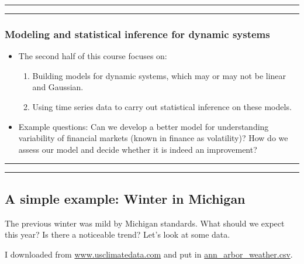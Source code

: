 \documentclass[]{article}
\begin{document}
\begin{center}\rule{0.5\linewidth}{\linethickness}\end{center}

\begin{center}\rule{0.5\linewidth}{\linethickness}\end{center}

\subsubsection{Modeling and statistical inference for dynamic
systems}\label{modeling-and-statistical-inference-for-dynamic-systems}

\begin{itemize}
\item
  The second half of this course focuses on:

  \begin{enumerate}
  \def\labelenumi{\arabic{enumi}.}
  \item
    Building models for dynamic systems, which may or may not be linear
    and Gaussian.
  \item
    Using time series data to carry out statistical inference on these
    models.
  \end{enumerate}
\item
  Example questions: Can we develop a better model for understanding
  variability of financial markets (known in finance as volatility)? How
  do we assess our model and decide whether it is indeed an improvement?
\end{itemize}

\begin{center}\rule{0.5\linewidth}{\linethickness}\end{center}

\begin{center}\rule{0.5\linewidth}{\linethickness}\end{center}

\subsection{A simple example: Winter in
Michigan}\label{a-simple-example-winter-in-michigan}

The previous winter was mild by Michigan standards. What should we
expect this year? Is there a noticeable trend? Let's look at some data.

I downloaded from
\href{https://www.usclimatedata.com/climate/ann-arbor/michigan/united-states/usmi0028}{www.usclimatedata.com}
and put in \url{ann_arbor_weather.csv}.
\end{document}
